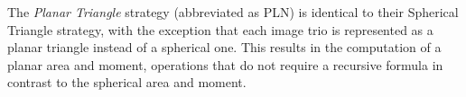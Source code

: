 


The \textit{Planar Triangle} strategy (abbreviated as PLN) is identical to their Spherical Triangle strategy, with the exception that each image trio is represented as a planar triangle instead of a spherical one.
This results in the computation of a planar area and moment, operations that do not require a recursive formula in contrast to the spherical area and moment.

